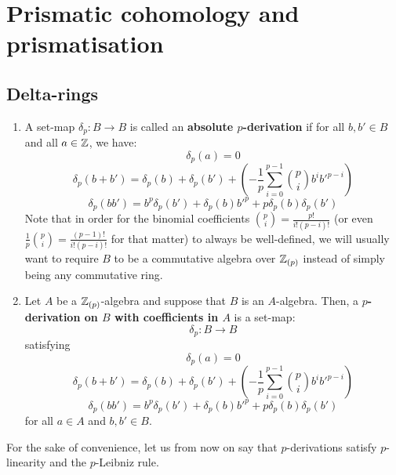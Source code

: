 \section{Prismatic cohomology and prismatisation}
    \subsection{Delta-rings}
        \begin{definition}[$p$-derivations] \label{def: p_derivations}
            \noindent
            \begin{enumerate}
                \item A set-map $\delta_p: B \to B$ is called an \textbf{absolute $p$-derivation} if for all $b, b' \in B$ and all $a \in \mathbb{Z}$, we have:
                    $$\delta_p(a) = 0$$
                    $$\delta_p(b + b') = \delta_p(b) + \delta_p(b') + \left(-\frac1p\sum_{i=0}^{p-1} \binom{p}{i} b^ib'^{p-i}\right)$$
                    $$\delta_p(bb') = b^p\delta_p(b') + \delta_p(b)b'^p + p\delta_p(b)\delta_p(b')$$
                Note that in order for the binomial coefficients $\binom{p}{i} = \frac{p!}{i! (p - i)!}$ (or even $\frac1p \binom{p}{i} = \frac{(p - 1)!}{i! (p - i)!}$ for that matter) to always be well-defined, we will usually want to require $B$ to be a commutative algebra over $\mathbb{Z}_{(p)}$ instead of simply being any commutative ring. 
                \item Let $A$ be a $\mathbb{Z}_{(p)}$-algebra and suppose that $B$ is an $A$-algebra. Then, a \textbf{$p$-derivation on $B$ with coefficients in $A$} is a set-map:
                    $$\delta_p: B \to B$$
                satisfying
                    $$\delta_p(a) = 0$$
                    $$\delta_p(b + b') = \delta_p(b) + \delta_p(b') + \left(-\frac1p\sum_{i=0}^{p-1} \binom{p}{i} b^ib'^{p-i}\right)$$
                    $$\delta_p(bb') = b^p\delta_p(b') + \delta_p(b)b'^p + p\delta_p(b)\delta_p(b')$$
                for all $a \in A$ and $b, b' \in B$.
            \end{enumerate}
        \end{definition}
        \begin{convention}
            For the sake of convenience, let us from now on say that $p$-derivations satisfy $p$-linearity and the $p$-Leibniz rule.
        \end{convention}
        
